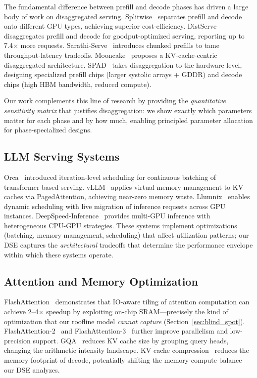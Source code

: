\documentclass[sigconf,10pt]{acmart}
\begin{document}
The fundamental difference between prefill and decode phases has driven
a large body of work on disaggregated serving.
Splitwise~\cite{splitwise2024} separates prefill and decode onto different
GPU types, achieving superior cost-efficiency. DistServe~\cite{distserve2024}
disaggregates prefill and decode for goodput-optimized serving, reporting
up to 7.4$\times$ more requests. Sarathi-Serve~\cite{agrawal2024sarathi}
introduces chunked prefills to tame throughput-latency tradeoffs.
Mooncake~\cite{mooncake2024} proposes a KV-cache-centric disaggregated
architecture. SPAD~\cite{spad2025} takes disaggregation to the hardware
level, designing specialized prefill chips (larger systolic arrays + GDDR)
and decode chips (high HBM bandwidth, reduced compute).

Our work complements this line of research by providing the \emph{quantitative
sensitivity matrix} that justifies disaggregation: we show exactly which
parameters matter for each phase and by how much, enabling principled
parameter allocation for phase-specialized designs.

\subsection{LLM Serving Systems}

Orca~\cite{yu2022orca} introduced iteration-level scheduling for
continuous batching of transformer-based serving.
vLLM~\cite{kwon2023efficient} applies virtual memory management to KV
caches via PagedAttention, achieving near-zero memory waste.
Llumnix~\cite{sun2024llumnix} enables dynamic scheduling with live
migration of inference requests across GPU instances.
DeepSpeed-Inference~\cite{aminabadi2022deepspeed} provides multi-GPU
inference with heterogeneous CPU-GPU strategies. These systems implement
optimizations (batching, memory management, scheduling) that affect
utilization patterns; our DSE captures the \emph{architectural}
tradeoffs that determine the performance envelope within which these
systems operate.

\subsection{Attention and Memory Optimization}

FlashAttention~\cite{dao2022flashattention} demonstrates that IO-aware
tiling of attention computation can achieve 2--4$\times$ speedup by
exploiting on-chip SRAM---precisely the kind of optimization that our
roofline model \emph{cannot capture} (Section~\ref{sec:blind_spot}).
FlashAttention-2~\cite{dao2023flashattention2} and
FlashAttention-3~\cite{shah2024flashattention3} further improve
parallelism and low-precision support.
GQA~\cite{ainslie2023gqa} reduces KV cache size by grouping query heads,
changing the arithmetic intensity landscape.
KV cache compression~\cite{yang2024kvcompress,hooper2025squeezed,xiao2024duoattention}
reduces the memory footprint of decode, potentially shifting the
memory-compute balance our DSE analyzes.
\end{document}
